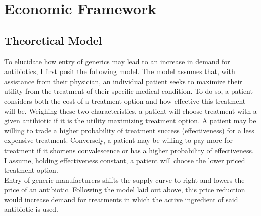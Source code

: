 \chapter{Economic Framework}
\section{Theoretical Model}
To elucidate how entry of generics may lead to an increase in demand for antibiotics, I first posit the following model. The model assumes that, with assistance from their physician, an individual patient seeks to maximize their utility from the treatment of their specific medical condition. To do so, a patient considers both the cost of a treatment option and how effective this treatment will be. Weighing these two characteristics, a patient will choose treatment with a given antibiotic if it is the utility maximizing treatment option. A patient may be willing to trade a higher probability of treatment success (effectiveness) for a less expensive treatment. Conversely, a patient may be willing to pay more for treatment if it shortens convalescence or has a higher probability of effectiveness. I assume, holding effectiveness constant, a patient will choose the lower priced treatment option.\\
\indent Entry of generic manufacturers shifts the supply curve to right and lowers the price of an antibiotic. Following the model laid out above, this price reduction would increase demand for treatments in which the active ingredient of said antibiotic is used.


